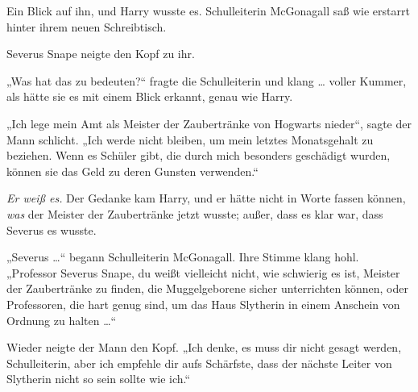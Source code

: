 Ein Blick auf ihn, und Harry wusste es. Schulleiterin McGonagall saß wie erstarrt hinter ihrem neuen Schreibtisch.

Severus Snape neigte den Kopf zu ihr.

„Was hat das zu bedeuten?“ fragte die Schulleiterin und klang … voller Kummer, als hätte sie es mit einem Blick erkannt, genau wie Harry.

„Ich lege mein Amt als Meister der Zaubertränke von Hogwarts nieder“, sagte der Mann schlicht.
„Ich werde nicht bleiben, um mein letztes Monatsgehalt zu beziehen. Wenn es Schüler gibt, die durch mich besonders geschädigt wurden, können sie das Geld zu deren Gunsten verwenden.“

\emph{Er weiß es.} Der Gedanke kam Harry, und er hätte nicht in Worte fassen können, \emph{was} der Meister der Zaubertränke jetzt wusste; außer, dass es klar war, dass Severus es wusste.

„Severus …“ begann Schulleiterin McGonagall. Ihre Stimme klang hohl.
„Professor Severus Snape, du weißt vielleicht nicht, wie schwierig es ist, Meister der Zaubertränke zu finden, die Muggelgeborene sicher unterrichten können, oder Professoren, die hart genug sind, um das Haus Slytherin in einem Anschein von Ordnung zu halten …“

Wieder neigte der Mann den Kopf.
„Ich denke, es muss dir nicht gesagt werden, Schulleiterin, aber ich empfehle dir aufs Schärfste, dass der nächste Leiter von Slytherin nicht so sein sollte wie ich.“

